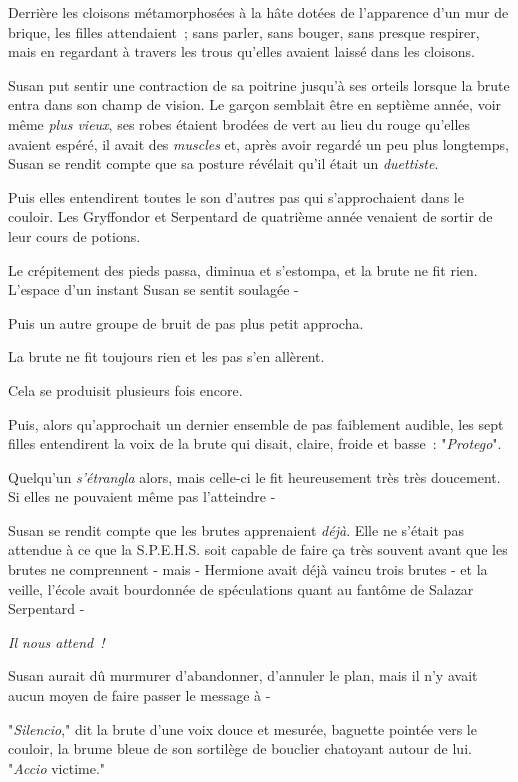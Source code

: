 Derrière les cloisons métamorphosées à la hâte dotées de l'apparence d'un mur de brique, les filles attendaient~; sans parler, sans bouger, sans presque respirer, mais en regardant à travers les trous qu'elles avaient laissé dans les cloisons.

Susan put sentir une contraction de sa poitrine jusqu'à ses orteils lorsque la brute entra dans son champ de vision. Le garçon semblait être en septième année, voir même \emph{plus vieux}, ses robes étaient brodées de vert au lieu du rouge qu'elles avaient espéré, il avait des \emph{muscles} et, après avoir regardé un peu plus longtemps, Susan se rendit compte que sa posture révélait qu'il était un \emph{duettiste}.

Puis elles entendirent toutes le son d'autres pas qui s'approchaient dans le couloir. Les Gryffondor et Serpentard de quatrième année venaient de sortir de leur cours de potions.

Le crépitement des pieds passa, diminua et s'estompa, et la brute ne fit rien. L'espace d'un instant Susan se sentit soulagée -

Puis un autre groupe de bruit de pas plus petit approcha.

La brute ne fit toujours rien et les pas s'en allèrent.

Cela se produisit plusieurs fois encore.

Puis, alors qu'approchait un dernier ensemble de pas faiblement audible, les sept filles entendirent la voix de la brute qui disait, claire, froide et basse~: "\emph{Protego}".

Quelqu'un \emph{s'étrangla} alors, mais celle-ci le fit heureusement très très doucement. Si elles ne pouvaient même pas l'atteindre -

Susan se rendit compte que les brutes apprenaient \emph{déjà}. Elle ne s'était pas attendue à ce que la S.P.E.H.S. soit capable de faire ça très souvent avant que les brutes ne comprennent - mais - Hermione avait déjà vaincu trois brutes - et la veille, l'école avait bourdonnée de spéculations quant au fantôme de Salazar Serpentard -

\emph{Il nous attend~!}

Susan aurait dû murmurer d'abandonner, d'annuler le plan, mais il n'y avait aucun moyen de faire passer le message à -

"\emph{Silencio}," dit la brute d'une voix douce et mesurée, baguette pointée vers le couloir, la brume bleue de son sortilège de bouclier chatoyant autour de lui. "\emph{Accio} victime."

